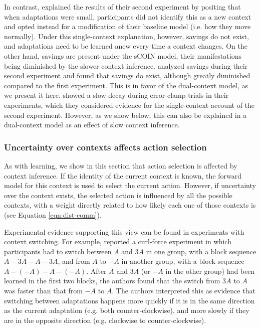 \documentclass[a4paper,doc,floatsintext,natbib]{apa6}
\def \eref #1{Equation \ref{#1}}   %
\begin{document}
In contrast, \cite{Oh_Minimizing_2019} explained the results of their second experiment by positing that when adaptations were small, participants did not identify this as a new context and opted instead for a modification of their baseline model (i.e. how they move normally). Under this single-context explanation, however, savings do not exist, and adaptations need to be learned anew every time a context changes. On the other hand, savings are present under the sCOIN model, their manifestations being diminished by the slower context inference. \cite{Oh_Minimizing_2019} analyzed savings during their second experiment and found that savings do exist, although greatly diminished compared to the first experiment. This is in favor of the dual-context model, as we present it here. \cite{Oh_Minimizing_2019} showed a slow decay during error-clamp trials in their experiments, which they considered evidence for the single-context account of the second experiment. However, as we show below, this can also be explained in a dual-context model as an effect of slow context inference.


\subsubsection{Uncertainty over contexts affects action selection}
As with learning, we show in this section that action selection is affected by context inference. If the identity of the current context is known, the forward model for this context is used to select the current action. However, if uncertainty over the context exists, the selected action is influenced by all the possible contexts, with a weight directly related to how likely each one of those contexts is (see \eref{eqn:dist-comm}).

Experimental evidence supporting this view can be found in experiments with context switching. For example, \cite{Davidson_Scaling_2004} reported a curl-force experiment in which participants had to switch between $A$ and $3A$ in one group, with a block sequence $A-3A-A-3A$, and from $A$ to $-A$ in another group, with a block sequence $A-(-A)-A-(-A)$. After $A$ and $3A$ (or $-A$ in the other group) had been learned in the first two blocks, the authors found that the switch from $3A$ to $A$ was faster than that from $-A$ to $A$. The authors interpreted this as evidence that switching between adaptations happens more quickly if it is in the same direction as the current adaptation (e.g. both counter-clockwise), and more slowly if they are in the opposite direction (e.g. clockwise to counter-clockwise).
\end{document}
